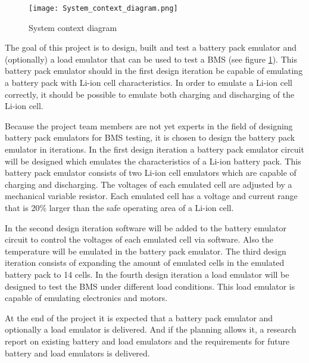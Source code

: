 \begin{figure}[ht]
    \centering
    \texttt{[image: System\_context\_diagram.png]}
    \caption{System context diagram}
    \label{fig:system_context_diagram}
\end{figure}

The goal of this project is to design, built and test a battery pack emulator and (optionally) a load emulator that can be used to test a BMS (see figure \ref{fig:system_context_diagram}). This battery pack emulator should in the first design iteration be capable of emulating a battery pack with Li-ion cell characteristics. In order to emulate a Li-ion cell correctly, it should be possible to emulate both charging and discharging of the Li-ion cell. 

Because the project team members are not yet experts in the field of designing battery pack emulators for BMS testing, it is chosen to design the battery pack emulator in iterations. In the first design iteration a battery pack emulator circuit will be designed which emulates the characteristics of a Li-ion battery pack. This battery pack emulator consists of two Li-ion cell emulators which are capable of charging and discharging. The voltages of each emulated cell are adjusted by a mechanical variable resistor. Each emulated cell has a voltage and current range that is 20\% larger than the safe operating area of a Li-ion cell.

In the second design iteration software will be added to the battery emulator circuit to control the voltages of each emulated cell via software. Also the temperature will be emulated in the battery pack emulator. The third design iteration consists of expanding the amount of emulated cells in the emulated battery pack to 14 cells. In the fourth design iteration a load emulator will be designed to test the BMS under different load conditions. This load emulator is capable of emulating electronics and motors. 


At the end of the project it is expected that a battery pack emulator and optionally a load emulator is delivered. And if the planning allows it, a research report on existing battery and load emulators and the requirements for future battery and load emulators is delivered.


